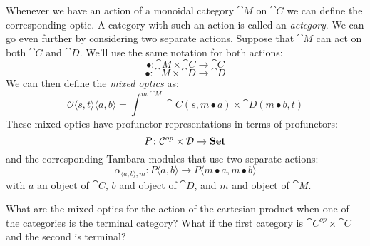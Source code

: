 \documentclass[DaoFP]{subfiles}
\begin{document}
Whenever we have an action of a monoidal category $\cat M$ on $\cat C$ we can define the corresponding optic. A category with such an action is called an \emph{actegory}. We can go even further by considering two separate actions. Suppose that $\cat M$ can act on both $\cat C$ and $\cat D$. We'll use the same notation for both actions:
\[ \bullet \colon \cat M \times \cat C \to \cat C \]
\[ \bullet \colon \cat M \times \cat D \to \cat D \]
We can then define the \emph{mixed optics} as:
\[ \mathcal{O} \langle s, t \rangle \langle a, b \rangle = \int^{m \colon \cat M} \cat C(s, m \bullet a) \times \cat D(m \bullet b, t) \]
These mixed optics have profunctor representations in terms of profunctors:
\[ P \colon \mathcal{C} ^{op} \times \mathcal{D} \to \mathbf{Set} \]
and the corresponding Tambara modules that use two separate actions:
\[ \alpha_{\langle a, b\rangle, m} \colon P \langle a, b \rangle \to P \langle m \bullet a, m \bullet b \rangle \]
with $a$ an object of $\cat C$, $b$ and object of $\cat D$, and $m$ and object of $\cat M$.

\begin{exercise}
What are the mixed optics for the action of the cartesian product when one of the categories is the terminal category? What if the first category is $\cat C^{op} \times \cat C$ and the second is terminal?
\end{exercise}
\end{document}
